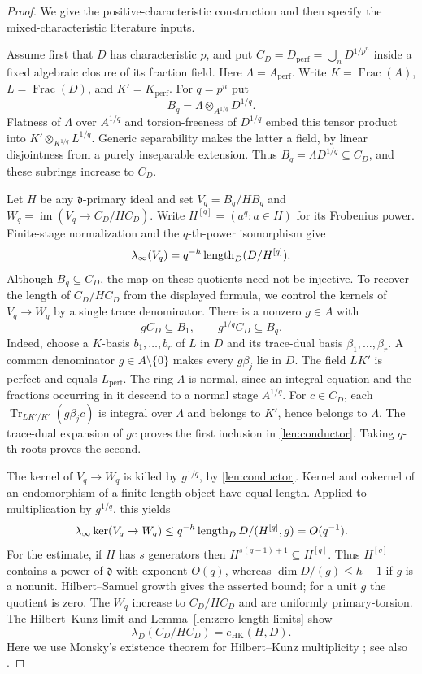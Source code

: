 \begin{proof}
We give the positive-characteristic construction and then specify the
mixed-characteristic literature inputs.

Assume first that $D$ has characteristic $p$, and put
$C_D=D_{\mathrm{perf}}=\bigcup_n D^{1/p^n}$ inside a fixed algebraic
closure of its fraction field. Here $\Lambda=A_{\mathrm{perf}}$.
Write $K=\operatorname{Frac}(A)$, $L=\operatorname{Frac}(D)$, and
$K'=K_{\mathrm{perf}}$.  For $q=p^n$ put
\[
 B_q=\Lambda\otimes_{A^{1/q}}D^{1/q}.
\]
Flatness of $\Lambda$ over $A^{1/q}$ and torsion-freeness of
$D^{1/q}$ embed this tensor product into
$K'\otimes_{K^{1/q}}L^{1/q}$.  Generic separability makes the latter
a field, by linear disjointness from a purely inseparable extension.
Thus $B_q=\Lambda D^{1/q}\subseteq C_D$, and these subrings increase
to $C_D$.

Let $H$ be any $\mathfrak d$-primary ideal and set
$V_q=B_q/HB_q$ and $W_q=\operatorname{im}(V_q\to C_D/HC_D)$.
Write $H^{[q]}=(a^q:a\in H)$ for its Frobenius power.
Finite-stage normalization and the $q$-th-power isomorphism give
\[
 \lambda_\infty(V_q)=q^{-h}\operatorname{length}_D(D/H^{[q]}).
\]
Although $B_q\subseteq C_D$, the map on these quotients need not be
injective.  To recover the length of $C_D/HC_D$ from the displayed
formula, we control the kernels of $V_q\to W_q$ by a single trace
denominator.  There is a nonzero $g\in A$ with
\begin{equation}\label{len:conductor}
 gC_D\subseteq B_1,\qquad g^{1/q}C_D\subseteq B_q.
\end{equation}
Indeed, choose a $K$-basis $b_1,\ldots,b_r$ of $L$ in $D$ and its
trace-dual basis $\beta_1,\ldots,\beta_r$.  A common denominator
$g\in A\setminus\{0\}$ makes every $g\beta_j$ lie in $D$.
The field $LK'$ is perfect and equals $L_{\mathrm{perf}}$.
The ring $\Lambda$ is normal, since an integral equation and the
fractions occurring in it descend to a normal stage $A^{1/q}$.
For $c\in C_D$, each
$\operatorname{Tr}_{LK'/K'}(g\beta_jc)$ is integral over $\Lambda$
and belongs to $K'$, hence belongs to $\Lambda$.  The trace-dual
expansion of $gc$ proves the first inclusion in
\eqref{len:conductor}.  Taking $q$-th roots proves the second.

The kernel of $V_q\to W_q$ is killed by $g^{1/q}$, by
\eqref{len:conductor}.  Kernel and cokernel of an endomorphism of a
finite-length object have equal length.  Applied to multiplication
by $g^{1/q}$, this yields
\[
 \lambda_\infty\ker(V_q\to W_q)
 \leq q^{-h}\operatorname{length}_D D/(H^{[q]},g)=O(q^{-1}).
\]
For the estimate, if $H$ has $s$ generators then
$H^{s(q-1)+1}\subseteq H^{[q]}$.  Thus $H^{[q]}$ contains a power
of $\mathfrak d$ with exponent $O(q)$, whereas
$\dim D/(g)\leq h-1$ if $g$ is a nonunit.  Hilbert--Samuel growth
gives the asserted bound; for a unit $g$ the quotient is zero.
The $W_q$ increase to $C_D/HC_D$ and are uniformly primary-torsion.
The Hilbert--Kunz limit and Lemma~\ref{len:zero-length-limits} show
\begin{equation}\label{len:perfection-quotient}
 \lambda_D(C_D/HC_D)=e_{\mathrm{HK}}(H,D).
\end{equation}
Here we use Monsky's existence theorem for Hilbert--Kunz multiplicity
\cite{Monsky}; see also \cite[Section~2.2]{Ma}.


\end{proof}
